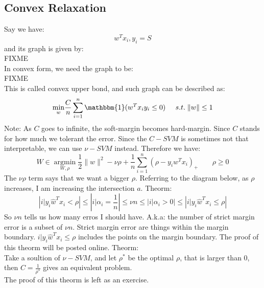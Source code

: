 \documentclass[twoside]{article}
\theoremstyle{definition}
\theoremstyle{definition}
\theoremstyle{remark}
\begin{document}
\subsection{Convex Relaxation}
Say we have:
\[ w^T x_i, y_i =S\]
and its graph is given by:\\
FIXME\\
In convex form, we need the graph to be:\\
FIXME\\
This is called convex upper bond, and such graph can be described as:
\[ \underset{w}{\operatorname{min}} \frac{C}{n} \sum_{i=1}^n \mathbbm{1} (w^T x_i y_i \leq 0) \;\;\;\;\; s.t. \; \|w\| \leq 1\]
Note: As $C$ goes to infinite, the soft-margin becomes hard-margin. Since $C$ stands for how much we tolerant the error. Since the $C-SVM$ is sometimes not that interpretable, we can use $\nu - SVM$ instead. Therefore we have:
\[\hat W \in \underset{W,\rho}{\operatorname{argmin}} \frac{1}{2} \|w\|^2 - \nu \rho + \frac{1}{n}\sum_{i=1}^n ( \rho - y_i w^T x_i )_+ \;\;\;\;\;\;\; \rho \geq 0\]
The $\nu\rho$ term says that we want a bigger $\rho$.
Referring to the diagram below, as $\rho$ increases, I am increasing the intersection $a$.
Theorm:
\[|{i|y_i \hat w^T x_i < \rho}| \leq | { i| \alpha_i = \frac{1}{n}}| \leq \nu n \leq |{i| \alpha_i > 0}| \leq | { i| y_i \hat w^T x_i \leq \rho}|\]
So $\nu n$ tells us how many erros I should have. A.k.a: the number of strict margin error is a subset of $\nu n$. Strict margin error are things within the margin boundary. ${i| y_i \hat w^T x_i \leq \rho}$ includes the points on the margin boundary. The proof of this theorm will be posted online.  
Theorm:\\
Take a soultion of $ \nu - SVM$, and let $\rho^*$ be the optimal $\rho$, that is larger than 0, then $C = \frac{1}{\rho^*}$ gives an equivalent problem. \\
The proof of this theorm is left as an exercise. 
\end{document}
